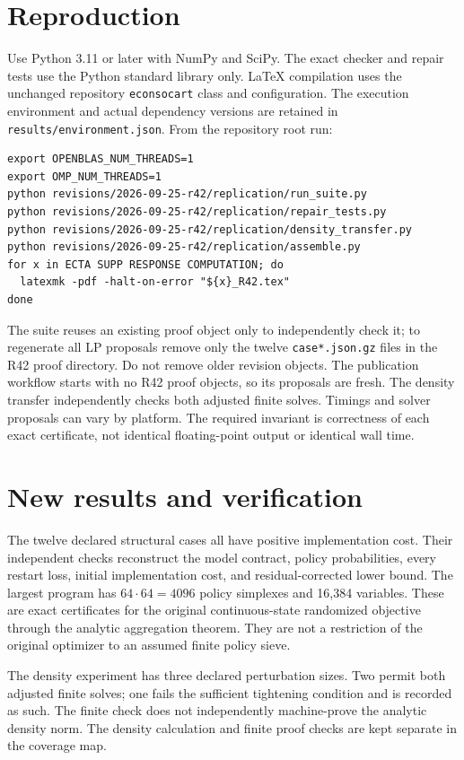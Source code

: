 \section{Reproduction}
Use Python 3.11 or later with NumPy and SciPy. The exact checker and repair tests use the Python standard library only. LaTeX compilation uses the unchanged repository \texttt{econsocart} class and configuration. The execution environment and actual dependency versions are retained in \texttt{results/environment.json}. From the repository root run:
{\small
\begin{verbatim}
export OPENBLAS_NUM_THREADS=1
export OMP_NUM_THREADS=1
python revisions/2026-09-25-r42/replication/run_suite.py
python revisions/2026-09-25-r42/replication/repair_tests.py
python revisions/2026-09-25-r42/replication/density_transfer.py
python revisions/2026-09-25-r42/replication/assemble.py
for x in ECTA SUPP RESPONSE COMPUTATION; do
  latexmk -pdf -halt-on-error "${x}_R42.tex"
done
\end{verbatim}
}
The suite reuses an existing proof object only to independently check it; to regenerate all LP proposals remove only the twelve \texttt{case*.json.gz} files in the R42 proof directory. Do not remove older revision objects. The publication workflow starts with no R42 proof objects, so its proposals are fresh. The density transfer independently checks both adjusted finite solves. Timings and solver proposals can vary by platform. The required invariant is correctness of each exact certificate, not identical floating-point output or identical wall time.

\section{New results and verification}
The twelve declared structural cases all have positive implementation cost. Their independent checks reconstruct the model contract, policy probabilities, every restart loss, initial implementation cost, and residual-corrected lower bound. The largest program has $64\cdot64=4096$ policy simplexes and 16,384 variables. These are exact certificates for the original continuous-state randomized objective through the analytic aggregation theorem. They are not a restriction of the original optimizer to an assumed finite policy sieve.

The density experiment has three declared perturbation sizes. Two permit both adjusted finite solves; one fails the sufficient tightening condition and is recorded as such. The finite check does not independently machine-prove the analytic density norm. The density calculation and finite proof checks are kept separate in the coverage map.

